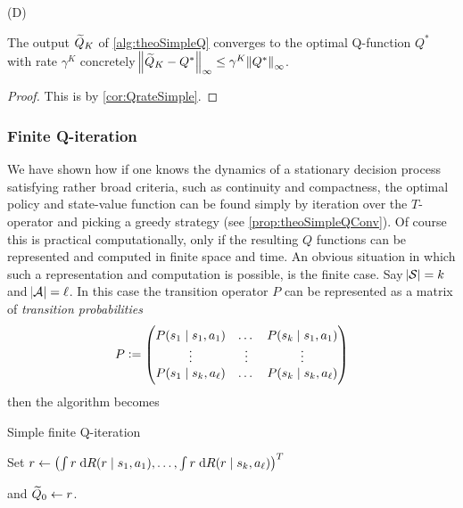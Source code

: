 \begin{prop}(D)

  The output $\widetilde{Q}_K$ of \cref{alg:theoSimpleQ} converges to the optimal
  Q-function $Q^*$ with rate $\gamma^K$ concretely
  $\norm{\widetilde{Q}_K - Q^*}_\infty \leq \gamma^K \norm{Q^*}_\infty$.
  \label{prop:theoSimpleQConv}
\end{prop}
\begin{proof}
  This is by \cref{cor:QrateSimple}.
\end{proof}

\subsubsection{Finite Q-iteration}
We have shown how if one knows the dynamics
of a stationary decision process satisfying rather broad criteria, 
such as continuity and compactness,
the optimal policy and state-value function can be found
simply by iteration over the $T$-operator and picking a greedy strategy
(see \cref{prop:theoSimpleQConv}).
Of course this is practical computationally, only if
the resulting $Q$ functions can be represented and computed in finite
space and time.
An obvious situation in which such a representation and computation is possible,
is the finite case.
Say $\abs{\mathcal{S}} = k$ and $\abs{\mathcal{A}} = \ell$.
In this case the transition operator $P$ can be represented as a
matrix of \emph{transition probabilities}
\[ P \vcentcolon= \begin{pmatrix}
    P(s_1 \mid s_1, a_1) & \dots & P(s_k \mid s_1, a_1)
    \\ \vdots & \vdots & \vdots
    \\ P(s_1 \mid s_k, a_\ell) & \dots & P(s_k \mid s_k, a_\ell)
\end{pmatrix} \]
then the algorithm becomes

\begin{algorithm}[H] %
\caption{Simple finite Q-iteration}
Set $ r \leftarrow \left(\int r \; \mathrm{d} R(r \mid s_1, a_1),
\dots, \int r \; \mathrm{d} R(r \mid s_k, a_\ell) \right)^T $

and $ \widetilde{Q}_0 \leftarrow r$.

\label{alg:finiteSimpleQ}
\end{algorithm}

